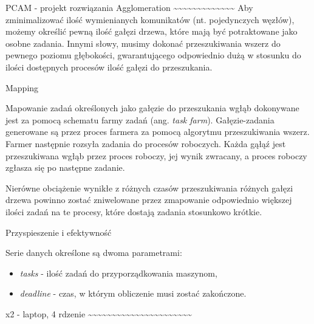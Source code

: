 \documentclass[ignorenonframetext,]{beamer}
\begin{document}
\begin{frame}[fragile]
\begin{block}{PCAM - projekt rozwiązania}
Agglomeration
\textasciitilde{}\textasciitilde{}\textasciitilde{}\textasciitilde{}\textasciitilde{}\textasciitilde{}\textasciitilde{}\textasciitilde{}\textasciitilde{}\textasciitilde{}\textasciitilde{}\textasciitilde{}\textasciitilde{}
Aby zminimalizować ilość wymienianych komunikatów (nt. pojedynczych
węzłów), możemy określić pewną ilość gałęzi drzewa, które mają być
potraktowane jako osobne zadania. Innymi słowy, musimy dokonać
przeszukiwania wszerz do pewnego poziomu głębokości, gwarantującego
odpowiednio dużą w stosunku do ilości dostępnych procesów ilość gałęzi
do przeszukania.

\end{block}

\begin{block}{Mapping}

Mapowanie zadań określonych jako gałęzie do przeszukania wgłąb
dokonywane jest za pomocą schematu farmy zadań (ang. \emph{task farm}).
Gałęzie-zadania generowane są przez proces farmera za pomocą algorytmu
przeszukiwania wszerz. Farmer następnie rozsyła zadania do procesów
roboczych. Każda gąłąź jest przeszukiwana wgłąb przez proces roboczy,
jej wynik zwracany, a proces roboczy zgłasza się po następne zadanie.

Nierówne obciążenie wynikłe z różnych czasów przeszukiwania różnych
gałęzi drzewa powinno zostać zniwelowane przez zmapowanie odpowiednio
większej ilości zadań na te procesy, które dostają zadania stosunkowo
krótkie.

\end{block}

\begin{block}{Przyspieszenie i efektywność}

Serie danych określone są dwoma parametrami:

\begin{itemize}
\item
  \emph{tasks} - ilość zadań do przyporządkowania maszynom,
\item
  \emph{deadline} - czas, w którym obliczenie musi zostać zakończone.
\end{itemize}

x2 - laptop, 4 rdzenie
\textasciitilde{}\textasciitilde{}\textasciitilde{}\textasciitilde{}\textasciitilde{}\textasciitilde{}\textasciitilde{}\textasciitilde{}\textasciitilde{}\textasciitilde{}\textasciitilde{}\textasciitilde{}\textasciitilde{}\textasciitilde{}\textasciitilde{}\textasciitilde{}\textasciitilde{}\textasciitilde{}\textasciitilde{}\textasciitilde{}\textasciitilde{}\textasciitilde{}


\end{block}
\end{frame}
\end{document}

